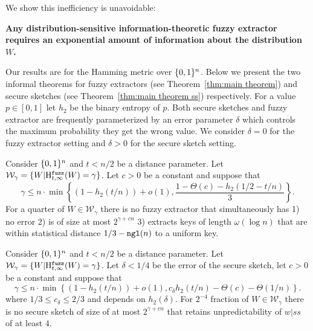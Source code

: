 We show this inefficiency is unavoidable:
\begin{displayquote}
\textbf{Any distribution-sensitive information-theoretic fuzzy extractor requires an exponential amount of information about the distribution $W$.} 
\end{displayquote} 
Our results are for the Hamming metric over $\{0, 1\}^n$. Below we present the two informal theorems for fuzzy extractors (see Theorem~\ref{thm:main theorem}) and secure sketches (see Theorem~\ref{thm:main theorem ss}) respectively.  For a value $p\in [0,1]$ let $h_2$ be the binary entropy of $p$. 
Both secure sketches and fuzzy extractor are frequently parameterized by an error parameter $\delta$ which controls the maximum probability they get the wrong value.  We consider $\delta=0$ for the fuzzy extractor setting and $\delta>0$ for the secure sketch setting. 

\begin{theorem}
Consider $\{0, 1\}^n$ and $t< n/2$ be a distance parameter.  Let $\mathcal{W}_\gamma=\{W | \mathrm{H}^{\mathtt{fuzz}}_{t,\infty}(W) = \gamma\}$.  Let $c>0$ be a constant and suppose that \[
\gamma \le n\cdot\min\left\{(1-h_2(t/n)) +o(1), \frac{1-\Theta(c)-h_2(1/2-t/n)}{3}\right\}.
\]
 For a quarter of $W \in \mathcal{W}_\gamma$ there is no fuzzy extractor that simultaneously has 1) no error 2) is of size at most $2^{\gamma+cn}$ 3) extracts keys of length $\omega(\log n)$ that are within statistical distance $1/3-\mathtt{ngl}(n)$ to a uniform key.
\end{theorem}


\begin{theorem}
Consider $\{0, 1\}^n$ and $t< n/2$ be a distance parameter.  Let $\mathcal{W}_\gamma=\{W | \mathrm{H}^{\mathtt{fuzz}}_{t,\infty}(W) = \gamma\}$.  Let $\delta<1/4$ be the error of the secure sketch, let $c>0$ be a constant and suppose that \[
\gamma \le n\cdot\min\left\{(1-h_2(t/n)) +o(1), c_\delta h_2(t/n)-\Theta(c)-\Theta(1/n)\right\}.
\]
where $1/3\le  c_\delta \le 2/3$ and depends on $h_2(\delta)$. 
 For $2^{-4}$ fraction of $W \in \mathcal{W}_\gamma$ there is no secure sketch of
size of at most $2^{\gamma+cn}$ that
 retains unpredictability of $w|ss$ of at  least $4$.
\end{theorem}

